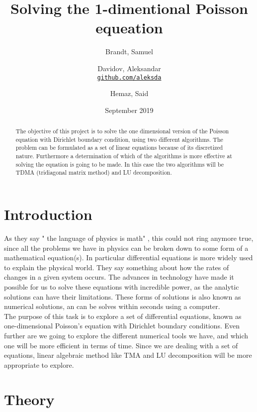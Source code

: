 \documentclass{article}
\title{Solving the 1-dimentional Poisson equeation}
\author{
  Brandt, Samuel\\
  \and
  Davidov, Aleksandar\\
  \textcolor{blue}{\href{https://github.com/aleksda/FYS4150/}{\texttt{github.com/aleksda}}}
  \and
  Hemaz, Said\\
}
\date{September 2019}
\begin{document}
\maketitle
\begin{abstract}
The objective of this project is to solve the one dimensional version of the Poisson equation with Dirichlet boundary condition, using two different algorithms. The problem can be formulated as a set of linear equations because of its discretized nature.  Furthermore a determination of which of the algorithms is more effective at solving the equation is going to be made. In this case the two algorithms will be TDMA (tridiagonal matrix method) and LU decomposition.

\end{abstract}
\tableofcontents

\iffalse
\begin{figure}[h!]
\centering
\texttt{[image: universe]}
\caption{The Universe}
\label{fig:universe}
\end{figure}
\fi
\newpage

\section{Introduction}
As they say " the language of physics is math" , this could not ring anymore true, since all the problems we have in physics can be broken down to some form of a mathematical equation(s). In particular differential equations is more widely used to explain the physical world. They say something about how the rates of changes in a given system occurs. The advances in technology have made it possible for us to solve these equations with incredible power, as the analytic solutions can have their limitations. These forms of solutions is also known as numerical solutions, an can be solves within seconds using a computer. \\

The purpose of this task is to explore a set of differential equations, known as one-dimensional Poisson's equation with Dirichlet boundary conditions. Even further are we going to explore the different numerical tools we have, and which one will be more efficient in terms of time. Since we are dealing with a set of equations, linear algebraic method like TMA and LU decomposition will be more appropriate to explore. 

\section{Theory}
\end{document}

